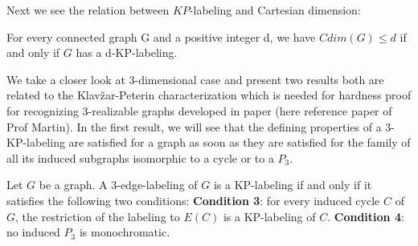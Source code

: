 \documentclass[12pt,a4paper,titlepage,openany]{report}
\begin{document}
Next we see the relation between $KP$-labeling and Cartesian dimension:
 \begin{theorem}\label{cdim<kp}
For every connected graph G and a positive integer d, we have $Cdim(G) \leq d$ if and only if $G$ has a d-KP-labeling.
\end{theorem}

We take a closer look at 3-dimensional case and present two results both are related to the Klav\v zar-Peterin characterization which is needed for hardness proof for recognizing 3-realizable graphs developed in paper (here reference paper of Prof Martin).\newline
In the first result, we will see that the defining properties of a 3-KP-labeling are satisfied for a graph as soon as they are satisfied for the family of all its induced subgraphs isomorphic to a cycle or to a $P_3$.

\begin{theorem}\label{3-edge-label}
Let $G$ be a graph. A 3-edge-labeling of $G$ is a KP-labeling if and only if it satisfies the following two conditions:\newline
\textbf{Condition 3}: for every induced cycle $C$ of $G$, the restriction of the labeling to $E(C)$ is
a KP-labeling of $C$.\newline
\textbf{Condition 4}: no induced $P_3$ is monochromatic.
\end{theorem}
\end{document}
